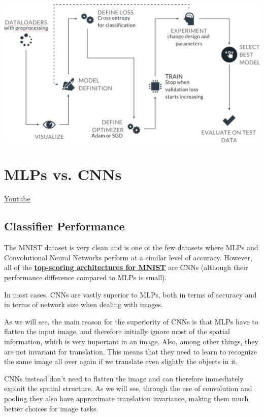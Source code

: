 \includegraphics[width=1\linewidth]{img//cnn//concepts/dev-process.jpeg}


\section{MLPs vs. CNNs}
\href{https://www.youtube.com/watch?v=O-uoAYIa9vs&ab_channel=Udacity}{Youtube}
\subsection{Classifier Performance}

The MNIST dataset is very clean and is one of the few datasets where MLPs and Convolutional Neural Networks perform at a similar level of accuracy. However, all of the \href{http://yann.lecun.com/exdb/mnist/}{\textbf{top-scoring architectures for MNIST}} are CNNs (although their performance difference compared to MLPs is small).\newline

In most cases, CNNs are vastly superior to MLPs, both in terms of accuracy and in terms of network size when dealing with images.\newline

As we will see, the main reason for the superiority of CNNs is that MLPs have to flatten the input image, and therefore initially ignore most of the spatial information, which is very important in an image. Also, among other things, they are not invariant for translation. This means that they need to learn to recognize the same image all over again if we translate even slightly the objects in it.\newline

CNNs instead don't need to flatten the image and can therefore immediately exploit the spatial structure. As we will see, through the use of convolution and pooling they also have approximate translation invariance, making them much better choices for image tasks.

